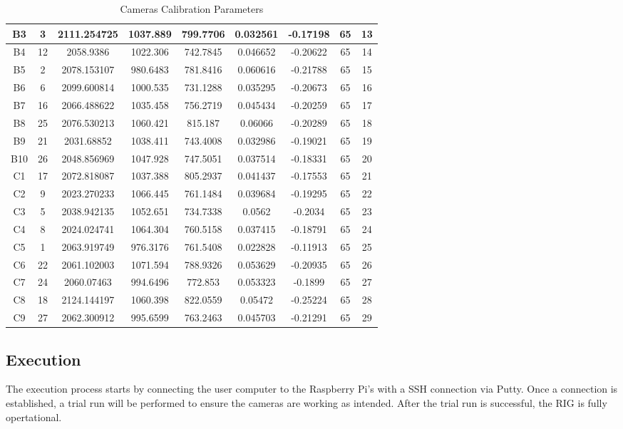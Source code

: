 \documentclass[12pt]{report}
\begin{document}
\begin{table}[H]
{\begin{tabular}{|c|c|c|c|c|c|c|c|c|}
  B3    & 3     & 2111.254725 & 1037.889 & 799.7706 & 0.032561 & -0.17198 & 65 & 13 \\ \hline
  B4    & 12    & 2058.9386   & 1022.306 & 742.7845 & 0.046652 & -0.20622 & 65 & 14 \\ \hline
  B5    & 2     & 2078.153107 & 980.6483 & 781.8416 & 0.060616 & -0.21788 & 65 & 15 \\ \hline
  B6    & 6     & 2099.600814 & 1000.535 & 731.1288 & 0.035295 & -0.20673 & 65 & 16 \\ \hline
  B7    & 16    & 2066.488622 & 1035.458 & 756.2719 & 0.045434 & -0.20259 & 65 & 17 \\ \hline
  B8    & 25    & 2076.530213 & 1060.421 & 815.187  & 0.06066  & -0.20289 & 65 & 18 \\ \hline
  B9    & 21    & 2031.68852  & 1038.411 & 743.4008 & 0.032986 & -0.19021 & 65 & 19 \\ \hline
  B10   & 26    & 2048.856969 & 1047.928 & 747.5051 & 0.037514 & -0.18331 & 65 & 20 \\ \hline
  C1    & 17    & 2072.818087 & 1037.388 & 805.2937 & 0.041437 & -0.17553 & 65 & 21 \\ \hline
  C2    & 9     & 2023.270233 & 1066.445 & 761.1484 & 0.039684 & -0.19295 & 65 & 22 \\ \hline
  C3    & 5     & 2038.942135 & 1052.651 & 734.7338 & 0.0562   & -0.2034  & 65 & 23 \\ \hline
  C4    & 8     & 2024.024741 & 1064.304 & 760.5158 & 0.037415 & -0.18791 & 65 & 24 \\ \hline
  C5    & 1     & 2063.919749 & 976.3176 & 761.5408 & 0.022828 & -0.11913 & 65 & 25 \\ \hline
  C6    & 22    & 2061.102003 & 1071.594 & 788.9326 & 0.053629 & -0.20935 & 65 & 26 \\ \hline
  C7    & 24    & 2060.07463  & 994.6496 & 772.853  & 0.053323 & -0.1899  & 65 & 27 \\ \hline
  C8    & 18    & 2124.144197 & 1060.398 & 822.0559 & 0.05472  & -0.25224 & 65 & 28 \\ \hline
  C9    & 27    & 2062.300912 & 995.6599 & 763.2463 & 0.045703 & -0.21291 & 65 & 29 \\ \hline
  \end{tabular}%
  }
  \caption{Cameras Calibration Parameters}
  \label{tab:Camera_Calibration}
  \end{table}

\subsection*{Execution}
The execution process starts by connecting the user computer to the Raspberry Pi's with a SSH connection via Putty.
Once a connection is established, a trial run will be performed to ensure the cameras are working as intended.
After the trial run is successful, the RIG is fully opertational.
\end{document}
